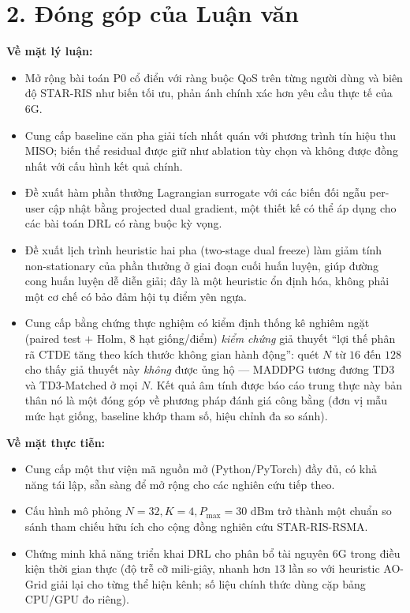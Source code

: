 \section*{2. Đóng góp của Luận văn}

\noindent\textbf{Về mặt lý luận:}
\begin{itemize}[leftmargin=*]
\item Mở rộng bài toán P0 cổ điển với ràng buộc QoS trên từng người dùng
và biên độ STAR-RIS như biến tối ưu, phản ánh chính xác hơn yêu cầu
thực tế của 6G.
\item Cung cấp baseline căn pha giải tích nhất quán với phương trình tín
hiệu thu MISO; biến thể residual được giữ như ablation tùy chọn và không
được đồng nhất với cấu hình kết quả chính.
\item Đề xuất hàm phần thưởng Lagrangian surrogate với các biến đối
ngẫu per-user cập nhật bằng projected dual gradient, một thiết kế có
thể áp dụng cho các bài toán DRL có ràng buộc kỳ vọng.
\item Đề xuất lịch trình heuristic hai pha (two-stage dual freeze)
làm giảm tính non-stationary của phần thưởng ở giai đoạn cuối huấn
luyện, giúp đường cong huấn luyện dễ diễn giải; đây là một heuristic
ổn định hóa, không phải một cơ chế có bảo đảm hội tụ điểm yên ngựa.
\item Cung cấp bằng chứng thực nghiệm có kiểm định thống kê nghiêm ngặt
(paired test $+$ Holm, $8$ hạt giống/điểm) \emph{kiểm chứng} giả thuyết
``lợi thế phân rã CTDE tăng theo kích thước không gian hành động'':
quét $N$ từ $16$ đến $128$ cho thấy giả thuyết này \emph{không} được
ủng hộ --- MADDPG tương đương TD3 và TD3-Matched ở mọi $N$. Kết quả
âm tính được báo cáo trung thực này bản thân nó là một đóng góp về
phương pháp đánh giá công bằng (đơn vị mẫu mức hạt giống, baseline
khớp tham số, hiệu chỉnh đa so sánh).
\end{itemize}

\noindent\textbf{Về mặt thực tiễn:}
\begin{itemize}[leftmargin=*]
\item Cung cấp một thư viện mã nguồn mở (Python/PyTorch) đầy đủ, có
khả năng tái lập, sẵn sàng để mở rộng cho các nghiên cứu tiếp theo.
\item Cấu hình mô phỏng $N=32, K=4, P_{\max}=30$ dBm trở thành một
chuẩn so sánh tham chiếu hữu ích cho cộng đồng nghiên cứu STAR-RIS-RSMA.
\item Chứng minh khả năng triển khai DRL cho phân bổ tài nguyên 6G
trong điều kiện thời gian thực (độ trễ cỡ mili-giây, nhanh hơn $13$
lần so với heuristic AO-Grid giải lại cho từng thể hiện kênh; số liệu
chính thức dùng cặp bảng CPU/GPU đo riêng).
\end{itemize}

